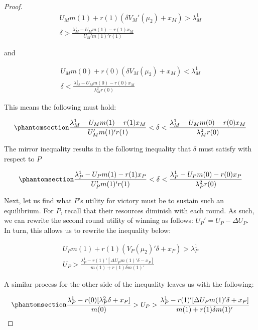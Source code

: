\documentclass[
  12pt,
]{article}
\theoremstyle{plain}
\theoremstyle{plain}
\theoremstyle{remark}
\begin{document}
\begin{proof}
\[
\begin{aligned}
U_M m(1) + r(1)(\delta V_M'(\mu_2) + x_M) > \lambda^1_M\\
\delta > \frac{\lambda^1_M - U_M m(1) - r(1)x_M}{ U_M' m(1)'r(1)}
\end{aligned}
\]

and

\[
\begin{aligned}
U_M m(0) + r(0)(\delta V_M(\mu_2) + x_M) <\lambda^1_M\\
\delta < \frac{\lambda^1_M - U_M m(0) - r(0)x_M}{ \lambda^2_Mr(0)}
\end{aligned}
\]

This means the following must hold:

\begin{equation}\phantomsection\label{eq-delta_sep_m}{
\frac{\lambda^1_M - U_M m(1) - r(1)x_M}{ U_M' m(1)'r(1)}<\delta < \frac{\lambda^1_M- U_M m(0) - r(0)x_M}{ \lambda^2_M r(0)}
}\end{equation}

The mirror inequality results in the following inequality that
\(\delta\) must satisfy with respect to \(P\)

\begin{equation}\phantomsection\label{eq-delta_sep_p}{
\frac{\lambda^1_P - U_P m(1) - r(1)x_P}{ U_P' m(1)'r(1)}<\delta < \frac{\lambda^1_P - U_P m(0) - r(0)x_P}{ \lambda^2_P r(0)}
}\end{equation}

Next, let us find what \(P\)'s utility for victory must be to sustain
such an equilibrium. For \(P\), recall that their resources diminish
with each round. As such, we can rewrite the second round utility of
winning as follows: \(U_P' = U_P - \Delta U_P\). In turn, this allows us
to rewrite the inequality below:

\[
\begin{aligned}
U_P m(1) + r(1)(V_P(\mu_2)'\delta + x_P) > \lambda^1_P\\
U_P > \frac{\lambda^1_P - r(1)'[ \Delta U_P m(1)' \delta - x_P]}{m(1) + r(1)\delta m(1)'}
\end{aligned}
\]

A similar process for the other side of the inequality leaves us with
the following:

\begin{equation}\phantomsection\label{eq-win_sep_p}{
\begin{aligned}
\frac{ \lambda^1_P - r(0)[\lambda^2_P \delta + x_P]}{m(0)} > U_P > \frac{\lambda^1_P - r(1)'[ \Delta U_P m(1)' \delta + x_P]}{m(1) + r(1)\delta m(1)'}\\
\end{aligned}
}\end{equation}


\end{proof}
\end{document}
